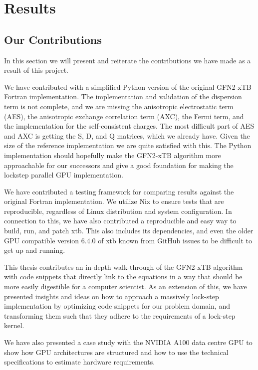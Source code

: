 \chapter{Results}\label{sec:results}

\section{Our Contributions}

In this section we will present and reiterate the contributions we have made as a result of this project.

We have contributed with a simplified Python version of the original GFN2-xTB Fortran implementation. The implementation and validation of the dispersion term is not complete, and we are missing the anisotropic electrostatic term (AES), the anisotropic exchange correlation term (AXC), the Fermi term, and the implementation for the self-consistent charges. The most difficult part of AES and AXC is getting the S, D, and Q matrices, which we already have. Given the size of the reference implementation we are quite satisfied with this. The Python implementation should hopefully make the GFN2-xTB algorithm more approachable for our successors and give a good foundation for making the lockstep parallel GPU implementation.

We have contributed a testing framework for comparing results against the original Fortran implementation. We utilize Nix to ensure tests that are reproducible, regardless of Linux distribution and system configuration. In connection to this, we have also contributed a reproducible and easy way to build, run, and patch xtb. This also includes its dependencies, and even the older GPU compatible version 6.4.0 of xtb known from GitHub issues to be difficult to get up and running.

This thesis contributes an in-depth walk-through of the GFN2-xTB algorithm with code snippets that directly link to the equations in a way that should be more easily digestible for a computer scientist. As an extension of this, we have presented insights and ideas on how to approach a massively lock-step implementation by optimizing code snippets for our problem domain, and transforming them such that they adhere to the requirements of a lock-step kernel.

We have also presented a case study with the NVIDIA A100 data centre GPU to show how GPU architectures are structured and how to use the technical specifications to estimate hardware requirements.

